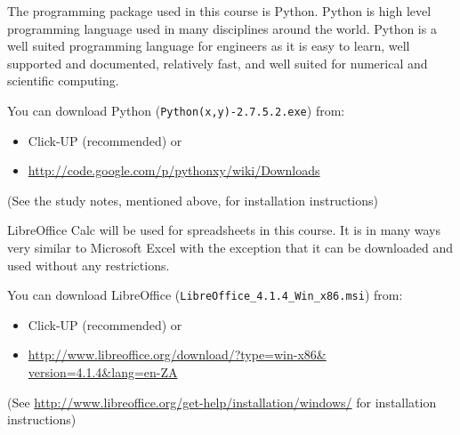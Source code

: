         The programming package used in this course is Python. Python is
        high level programming language used in many disciplines around the
        world. Python is a well suited programming language for engineers as
        it is easy to learn, well supported and documented, relatively fast,
        and well suited for numerical and scientific computing.

        You can download Python ({\tt Python(x,y)-2.7.5.2.exe}) from:
        \begin{itemize}
            \item Click-UP (recommended) or
            \item \url{http://code.google.com/p/pythonxy/wiki/Downloads}
        \end{itemize}
        (See the study notes, mentioned above, for installation instructions)

        LibreOffice Calc will be used for spreadsheets in this course. It is
        in many ways very similar to Microsoft Excel with the exception
        that it can be downloaded and used without any restrictions.

        You can download LibreOffice
        ({\tt LibreOffice\_4.1.4\_Win\_x86.msi}) from:
        \begin{itemize}
            \item Click-UP (recommended) or
            \item \url{http://www.libreoffice.org/download/?type=win-x86&
                       version=4.1.4&lang=en-ZA}
        \end{itemize}
        (See \url{http://www.libreoffice.org/get-help/installation/windows/}
        for installation instructions)
